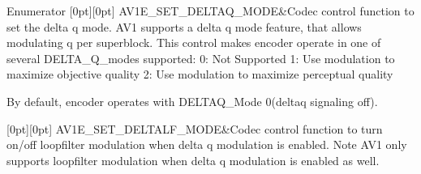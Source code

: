 \begin{DoxyEnumFields}{Enumerator}
[0pt][0pt]{}\mbox{\label{group__aom__encoder_ggae78dde67a6d78f332e9bdba0dde42db5ad26eda6211bf3d5fe4f5999ec52b264b}} 
A\+V1\+E\+\_\+\+S\+E\+T\+\_\+\+D\+E\+L\+T\+A\+Q\+\_\+\+M\+O\+DE&Codec control function to set the delta q mode. A\+V1 supports a delta q mode feature, that allows modulating q per superblock. This control makes encoder operate in one of several D\+E\+L\+T\+A\+\_\+\+Q\+\_\+modes supported\+: 0\+: Not Supported 1\+: Use modulation to maximize objective quality 2\+: Use modulation to maximize perceptual quality

By default, encoder operates with D\+E\+L\+T\+A\+Q\+\_\+\+Mode 0(deltaq signaling off). \\
\hline

[0pt][0pt]{}\mbox{\label{group__aom__encoder_ggae78dde67a6d78f332e9bdba0dde42db5ab2d0e42bcf19974859e61d8709c5ae09}} 
A\+V1\+E\+\_\+\+S\+E\+T\+\_\+\+D\+E\+L\+T\+A\+L\+F\+\_\+\+M\+O\+DE&Codec control function to turn on/off loopfilter modulation when delta q modulation is enabled. Note A\+V1 only supports loopfilter modulation when delta q modulation is enabled as well. \\
\hline


\end{DoxyEnumFields}
